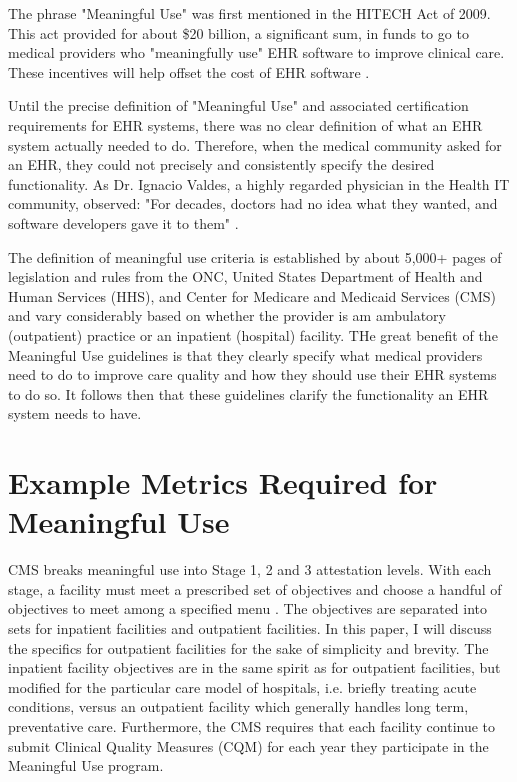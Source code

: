 \documentclass[10pt]{article}
\begin{document}
The phrase "Meaningful Use" was first mentioned in the HITECH Act of 2009.
This act provided for about \$20 billion, a significant sum, in funds to go to medical providers who "meaningfully use" EHR software to improve clinical care.
These incentives will help offset the cost of EHR software \cite{health-hack}.

Until the precise definition of "Meaningful Use" and associated certification requirements for EHR systems, there was no clear definition of what an EHR system actually needed to do.
Therefore, when the medical community asked for an EHR, they could not precisely and consistently specify the desired functionality.
As Dr. Ignacio Valdes, a highly regarded physician in the Health IT community, observed: "For decades, doctors had no idea what they wanted, and software developers gave it to them" \cite{health-hack}.

The definition of meaningful use criteria is established by about 5,000+ pages of legislation and rules from the ONC, United States Department of Health and Human Services (HHS), and Center for Medicare and Medicaid Services (CMS) and vary considerably based on whether the provider is am ambulatory (outpatient) practice or an inpatient (hospital) facility.
THe great benefit of the Meaningful Use guidelines is that they clearly specify what medical providers need to do to improve care quality and how they should use their EHR systems to do so.
It follows then that these guidelines clarify the functionality an EHR system needs to have.

\section{Example Metrics Required for Meaningful Use}
\label{sec:Meaningful Use Metrics}

CMS breaks meaningful use into Stage 1, 2 and 3 attestation levels.
With each stage, a facility must meet a prescribed set of objectives and choose a handful of objectives to meet among a specified menu \cite{cms-stage1}.
The objectives are separated into sets for inpatient facilities and outpatient facilities.
In this paper, I will discuss the specifics for outpatient facilities for the sake of simplicity and brevity.
The inpatient facility objectives are in the same spirit as for outpatient facilities, but modified for the particular care model of hospitals, i.e. briefly treating acute conditions, versus an outpatient facility which generally handles long term, preventative care.
Furthermore, the CMS requires that each facility continue to submit Clinical Quality Measures (CQM) for each year they participate in the Meaningful Use program.
\end{document}
